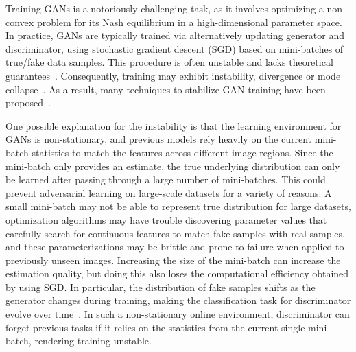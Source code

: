 \documentclass{article}
\begin{document}
Training GANs is a notoriously challenging task, as it involves optimizing a non-convex problem for its Nash equilibrium in a high-dimensional parameter space. In practice, GANs are typically trained via alternatively updating generator and discriminator, using stochastic gradient descent (SGD) based on mini-batches of true/fake data samples. This procedure is often unstable and lacks theoretical guarantees~\cite{salimans2016improved}. Consequently, training may exhibit instability, divergence or mode collapse~\cite{mescheder2018training}. As a result, many techniques to stabilize GAN training have been proposed~\cite{salimans2016improved,miyato2018spectral,karras2019analyzing}.

One possible explanation for the instability is that the learning environment for GANs is non-stationary, and previous models rely heavily on the current mini-batch statistics to match the features across different image regions. Since the mini-batch only provides an estimate, the true underlying distribution can only be learned after passing through a large number of mini-batches. 
This could prevent adversarial learning on large-scale datasets for a variety of reasons: 
 A small mini-batch may not be able to represent true distribution for large datasets, optimization algorithms may have trouble discovering parameter values that carefully search for continuous features to match fake samples with real samples, and these parameterizations may be brittle and prone to failure when applied to previously unseen images. 
 Increasing the size of the mini-batch can increase the estimation quality, but doing this also loses the computational efficiency obtained by using SGD.
 In particular, the distribution of fake samples shifts as the generator changes during training, making the classification task for discriminator evolve over time~\cite{chen2019self,liang2018generative,zhao2020leveraging,cong2020lmemory}. In such a non-stationary online environment, discriminator can forget previous tasks if it relies on the statistics from the current single mini-batch, rendering training unstable. 
\end{document}
